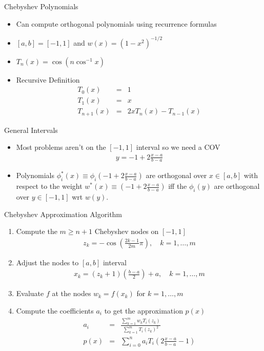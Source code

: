 \documentclass[aspectratio=169,11pt]{beamer}
\begin{document}
\begin{frame}{Chebyshev Polynomials}
\begin{itemize}
\item Can compute orthogonal polynomials using recurrence formulas
\item $[a,b] = [-1,1]$ and $w(x) = (1-x^2)^{-1/2}$
\item $T_n(x) = \cos(n \cos^{-1} x)$
\item Recursive Definition 
\begin{eqnarray*}
T_0(x) &=& 1\\
T_1(x) &=& x\\
T_{n+1}(x) &=& 2x T_n(x) - T_{n-1}(x)
\end{eqnarray*}
\end{itemize}
\begin{block}{General Intervals}
\begin{itemize}
\item Most problems aren't on the $[-1,1]$ interval so we need a COV
\begin{eqnarray*}
y = -1 + 2 \frac{x-a}{b-a}
\end{eqnarray*}
\item Polynomials $\phi_i^{*}(x) \equiv \phi_i (-1 + 2 \frac{x-a}{b-a})$ are orthogonal over $x \in[a,b]$ with respect to the weight $w^{*}(x) \equiv (-1 + 2 \frac{x-a}{b-a})$ iff the $\phi_i(y)$ are orthogonal over $y\in[-1,1]$ wrt $w(y)$.
\end{itemize} 
\end{block}
\end{frame}

\begin{frame}{Chebyshev Approximation Algorithm}
\begin{enumerate}
\item Compute the $m \geq n+1$ Chebyshev nodes on $[-1,1]$
\begin{eqnarray*}
z_k = -\cos \left ( \frac{2k-1}{2m} \pi \right) , \quad k=1,\ldots,m
\end{eqnarray*}
\item Adjust the nodes to $[a,b]$ interval
\begin{eqnarray*}
x_k = (z_k + 1)\left(\frac{b-a}{2} \right) + a , \quad k=1,\ldots,m
\end{eqnarray*}
\item Evaluate $f$ at the nodes $w_k = f(x_k)$ for $ k=1,\ldots,m$
\item Compute the coefficients $a_i$ to get the approximation $p(x)$
\begin{eqnarray*}
a_i &=& \frac{\sum_{k=1}^m w_k T_i(z_k)}{\sum_{k=1}^m  T_i(z_k)^2} \\
p(x) &=& \sum_{i=0}^n a_i T_i \left( 2 \frac{x-a}{b-a} -1 \right) 
\end{eqnarray*}
\end{enumerate}
\end{frame}
\end{document}
